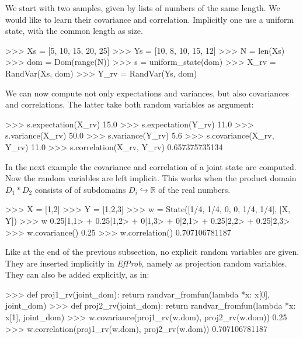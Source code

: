 \documentclass[leqno]{tufte-book} %
\newcommand{\EfProb}{\textit{EfProb}\xspace}
\newcommand{\RN}{\mathbb{R}}     %
\begin{document}
%

We start with two samples, given by lists of numbers of the same
length. We would like to learn their covariance and correlation.
Implicitly one use a uniform state, with the common length as size.
\begin{python}
>>> Xs = [5, 10, 15, 20, 25]
>>> Ys = [10,  8, 10, 15, 12]
>>> N = len(Xs)
>>> dom = Dom(range(N))
>>> s = uniform_state(dom)
>>> X_rv = RandVar(Xs, dom)
>>> Y_rv = RandVar(Ys, dom)
\end{python}

\noindent We can now compute not only expectations and variances, but
also covariances and correlations. The latter take both random
variables as argument:
\begin{python}
>>> s.expectation(X_rv)
15.0
>>> s.expectation(Y_rv)
11.0
>>> s.variance(X_rv)
50.0
>>> s.variance(Y_rv)
5.6
>>> s.covariance(X_rv, Y_rv)
11.0
>>> s.correlation(X_rv, Y_rv)
0.657375735134
\end{python}


In the next example the covariance and correlation of a joint state
are computed. Now the random variables are left implicit.  This works
when the product domain $D_{1} * D_{2}$ consists of of subdomains
$D_{i} \hookrightarrow \RN$ of the real numbers.
\begin{python}
>>> X = [1,2]
>>> Y = [1,2,3]
>>> w = State([1/4, 1/4, 0, 0, 1/4, 1/4], [X, Y])
>>> w
0.25|1,1> + 0.25|1,2> + 0|1,3> + 0|2,1> + 0.25|2,2> + 0.25|2,3>
>>> w.covariance()
0.25
>>> w.correlation()
0.707106781187
\end{python}

\noindent Like at the end of the previous subsection, no explicit
random variables are given. They are inserted implicitly in \EfProb,
namely as projection random variables. They can also be added 
explicitly, as in:
\begin{python}
>>> def proj1_rv(joint_dom): return randvar_fromfun(lambda *x: x[0], joint_dom)
>>> def proj2_rv(joint_dom): return randvar_fromfun(lambda *x: x[1], joint_dom)
>>> w.covariance(proj1_rv(w.dom), proj2_rv(w.dom))
0.25
>>> w.correlation(proj1_rv(w.dom), proj2_rv(w.dom))
0.707106781187
\end{python}
\end{document}
